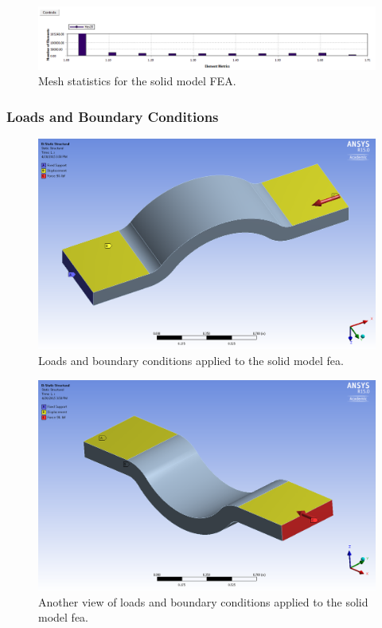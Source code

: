 \begin{figure}[htp]
\centering
\includegraphics[width=1\textwidth]{./figures/fea/fea-solid-mesh-metrics}
\caption{Mesh statistics for the solid model FEA.}
\label{fig:fea-solid-mesh-metrics}
\end{figure}

\clearpage

\subsubsection{Loads and Boundary Conditions}

\begin{figure}[htp]
\centering
\includegraphics[width=1\textwidth]{./figures/fea/fea-solid-loads-bcs}
\caption{Loads and boundary conditions applied to the solid model fea.}
\label{fig:fea-solid-loads-bcs}
\end{figure}

\begin{figure}[htp]
\centering
\includegraphics[width=1\textwidth]{./figures/fea/fea-solid-loads-bcs-3}
\caption{Another view of loads and boundary conditions applied to the solid model fea.}
\label{fig:fea-solid-loads-bcs-3}
\end{figure}

